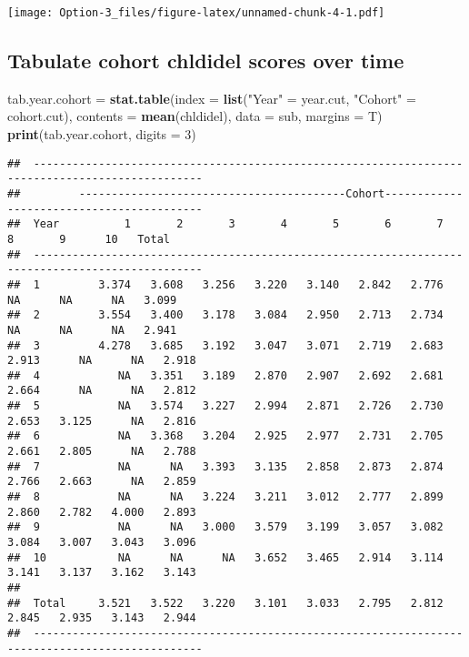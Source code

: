 \documentclass[]{article}
\newenvironment{Shaded}{\begin{snugshade}}{\end{snugshade}}
\newcommand{\DataTypeTok}[1]{\textcolor[rgb]{0.13,0.29,0.53}{#1}}
\newcommand{\DecValTok}[1]{\textcolor[rgb]{0.00,0.00,0.81}{#1}}
\newcommand{\KeywordTok}[1]{\textcolor[rgb]{0.13,0.29,0.53}{\textbf{#1}}}
\newcommand{\NormalTok}[1]{#1}
\newcommand{\StringTok}[1]{\textcolor[rgb]{0.31,0.60,0.02}{#1}}
\begin{document}
\texttt{[image: Option-3\_files/figure-latex/unnamed-chunk-4-1.pdf]}

\hypertarget{tabulate-cohort-chldidel-scores-over-time}{%
\subsection{Tabulate cohort chldidel scores over
time}\label{tabulate-cohort-chldidel-scores-over-time}}

\begin{Shaded}
\begin{Highlighting}[]
\NormalTok{tab.year.cohort =}\StringTok{ }\KeywordTok{stat.table}\NormalTok{(}\DataTypeTok{index =} \KeywordTok{list}\NormalTok{(}\StringTok{"Year"}\NormalTok{ =}\StringTok{ }\NormalTok{year.cut, }\StringTok{"Cohort"}\NormalTok{ =}\StringTok{ }\NormalTok{cohort.cut),}
                             \DataTypeTok{contents =} \KeywordTok{mean}\NormalTok{(chldidel),}
                             \DataTypeTok{data =}\NormalTok{ sub,}
                             \DataTypeTok{margins =}\NormalTok{ T)}
\KeywordTok{print}\NormalTok{(tab.year.cohort, }\DataTypeTok{digits =} \DecValTok{3}\NormalTok{)}
\end{Highlighting}
\end{Shaded}

\begin{verbatim}
##  ------------------------------------------------------------------------------------------------ 
##         -----------------------------------------Cohort------------------------------------------ 
##  Year          1       2       3       4       5       6       7       8       9      10   Total  
##  ------------------------------------------------------------------------------------------------ 
##  1         3.374   3.608   3.256   3.220   3.140   2.842   2.776      NA      NA      NA   3.099  
##  2         3.554   3.400   3.178   3.084   2.950   2.713   2.734      NA      NA      NA   2.941  
##  3         4.278   3.685   3.192   3.047   3.071   2.719   2.683   2.913      NA      NA   2.918  
##  4            NA   3.351   3.189   2.870   2.907   2.692   2.681   2.664      NA      NA   2.812  
##  5            NA   3.574   3.227   2.994   2.871   2.726   2.730   2.653   3.125      NA   2.816  
##  6            NA   3.368   3.204   2.925   2.977   2.731   2.705   2.661   2.805      NA   2.788  
##  7            NA      NA   3.393   3.135   2.858   2.873   2.874   2.766   2.663      NA   2.859  
##  8            NA      NA   3.224   3.211   3.012   2.777   2.899   2.860   2.782   4.000   2.893  
##  9            NA      NA   3.000   3.579   3.199   3.057   3.082   3.084   3.007   3.043   3.096  
##  10           NA      NA      NA   3.652   3.465   2.914   3.114   3.141   3.137   3.162   3.143  
##                                                                                                   
##  Total     3.521   3.522   3.220   3.101   3.033   2.795   2.812   2.845   2.935   3.143   2.944  
##  ------------------------------------------------------------------------------------------------
\end{verbatim}
\end{document}
